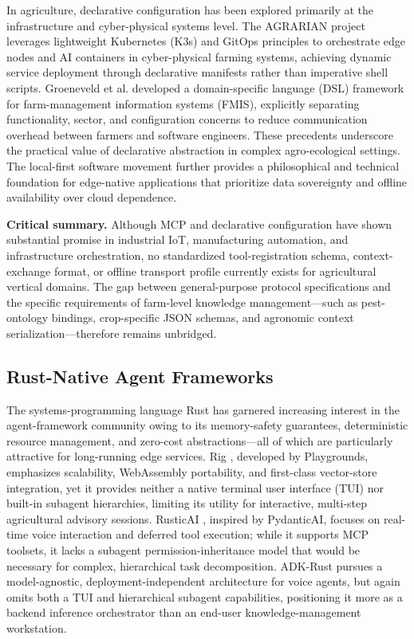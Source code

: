 \documentclass[11pt,a4paper]{article}
\begin{document}
In agriculture, declarative configuration has been explored primarily at the infrastructure and cyber-physical systems level. The AGRARIAN project \cite{agrarian2025} leverages lightweight Kubernetes (K3s) and GitOps principles to orchestrate edge nodes and AI containers in cyber-physical farming systems, achieving dynamic service deployment through declarative manifests rather than imperative shell scripts. Groeneveld et al. \cite{groeneveld2021dsl} developed a domain-specific language (DSL) framework for farm-management information systems (FMIS), explicitly separating functionality, sector, and configuration concerns to reduce communication overhead between farmers and software engineers. These precedents underscore the practical value of declarative abstraction in complex agro-ecological settings. The local-first software movement \cite{kleppmann2021localfirst} further provides a philosophical and technical foundation for edge-native applications that prioritize data sovereignty and offline availability over cloud dependence.

\textbf{Critical summary.} Although MCP and declarative configuration have shown substantial promise in industrial IoT, manufacturing automation, and infrastructure orchestration, no standardized tool-registration schema, context-exchange format, or offline transport profile currently exists for agricultural vertical domains. The gap between general-purpose protocol specifications and the specific requirements of farm-level knowledge management---such as pest-ontology bindings, crop-specific JSON schemas, and agronomic context serialization---therefore remains unbridged.

\subsection{Rust-Native Agent Frameworks}

The systems-programming language Rust has garnered increasing interest in the agent-framework community owing to its memory-safety guarantees, deterministic resource management, and zero-cost abstractions---all of which are particularly attractive for long-running edge services. Rig \cite{playgrounds2025rig}, developed by Playgrounds, emphasizes scalability, WebAssembly portability, and first-class vector-store integration, yet it provides neither a native terminal user interface (TUI) nor built-in subagent hierarchies, limiting its utility for interactive, multi-step agricultural advisory sessions. RusticAI \cite{rusticai2025}, inspired by PydanticAI, focuses on real-time voice interaction and deferred tool execution; while it supports MCP toolsets, it lacks a subagent permission-inheritance model that would be necessary for complex, hierarchical task decomposition. ADK-Rust \cite{zavora2025adkrust} pursues a model-agnostic, deployment-independent architecture for voice agents, but again omits both a TUI and hierarchical subagent capabilities, positioning it more as a backend inference orchestrator than an end-user knowledge-management workstation.
\end{document}

